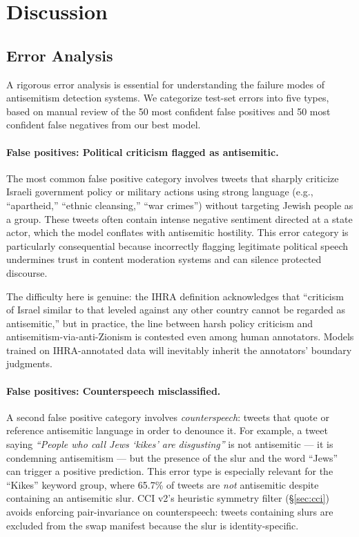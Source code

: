 \section{Discussion}
\label{sec:discussion}

\subsection{Error Analysis}

A rigorous error analysis is essential for understanding the failure modes of antisemitism detection systems. We categorize test-set errors into five types, based on manual review of the 50 most confident false positives and 50 most confident false negatives from our best model.

\paragraph{False positives: Political criticism flagged as antisemitic.}
The most common false positive category involves tweets that sharply criticize Israeli government policy or military actions using strong language (e.g., ``apartheid,'' ``ethnic cleansing,'' ``war crimes'') without targeting Jewish people as a group. These tweets often contain intense negative sentiment directed at a state actor, which the model conflates with antisemitic hostility. This error category is particularly consequential because incorrectly flagging legitimate political speech undermines trust in content moderation systems and can silence protected discourse.

The difficulty here is genuine: the IHRA definition acknowledges that ``criticism of Israel similar to that leveled against any other country cannot be regarded as antisemitic,'' but in practice, the line between harsh policy criticism and antisemitism-via-anti-Zionism is contested even among human annotators. Models trained on IHRA-annotated data will inevitably inherit the annotators' boundary judgments.

\paragraph{False positives: Counterspeech misclassified.}
A second false positive category involves \emph{counterspeech}: tweets that quote or reference antisemitic language in order to denounce it. For example, a tweet saying \emph{``People who call Jews `kikes' are disgusting''} is not antisemitic --- it is condemning antisemitism --- but the presence of the slur and the word ``Jews'' can trigger a positive prediction. This error type is especially relevant for the ``Kikes'' keyword group, where 65.7\% of tweets are \emph{not} antisemitic despite containing an antisemitic slur. CCI v2's heuristic symmetry filter (\S\ref{sec:cci}) avoids enforcing pair-invariance on counterspeech: tweets containing slurs are excluded from the swap manifest because the slur is identity-specific.

